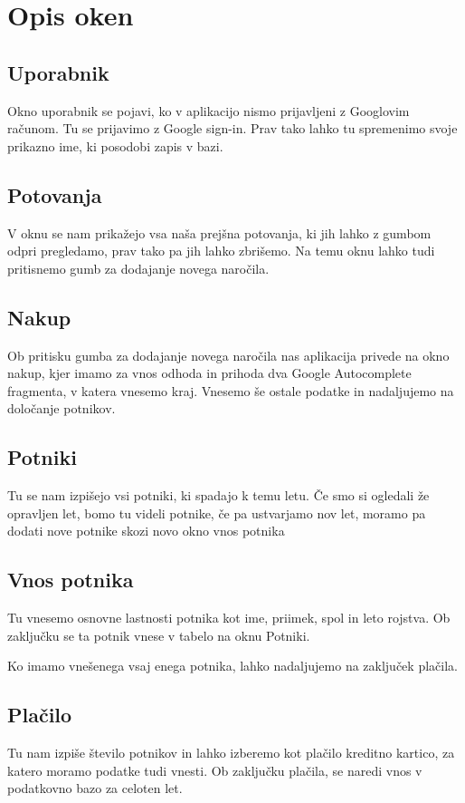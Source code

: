 \documentclass[11pt,a4paper]{article}
\begin{document}
\section{Opis oken}
\subsection{Uporabnik}
Okno uporabnik se pojavi, ko v aplikacijo nismo prijavljeni z Googlovim računom.
Tu se prijavimo z Google sign-in. Prav tako lahko tu spremenimo svoje prikazno ime, ki posodobi zapis v bazi.

\subsection{Potovanja}
V oknu se nam prikažejo vsa naša prejšna potovanja, ki jih lahko z gumbom odpri pregledamo, prav tako pa jih lahko zbrišemo.
Na temu oknu lahko tudi pritisnemo gumb za dodajanje novega naročila.

\subsection{Nakup}
Ob pritisku gumba za dodajanje novega naročila nas aplikacija privede na okno nakup, kjer imamo za vnos odhoda in prihoda dva Google Autocomplete fragmenta, v katera vnesemo kraj.
Vnesemo še ostale podatke in nadaljujemo na določanje potnikov.

\subsection{Potniki}
Tu se nam izpišejo vsi potniki, ki spadajo k temu letu. Če smo si ogledali že opravljen let, bomo tu videli potnike, če pa ustvarjamo nov let, moramo pa dodati nove potnike skozi novo okno vnos potnika

\subsection{Vnos potnika}
Tu vnesemo osnovne lastnosti potnika kot ime, priimek, spol in leto rojstva.
Ob zaključku se ta potnik vnese v tabelo na oknu Potniki.

Ko imamo vnešenega vsaj enega potnika, lahko nadaljujemo na zaključek plačila.

\subsection{Plačilo}
Tu nam izpiše število potnikov in lahko izberemo kot plačilo kreditno kartico, za katero moramo podatke tudi vnesti.
Ob zaključku plačila, se naredi vnos v podatkovno bazo za celoten let.
\end{document}
